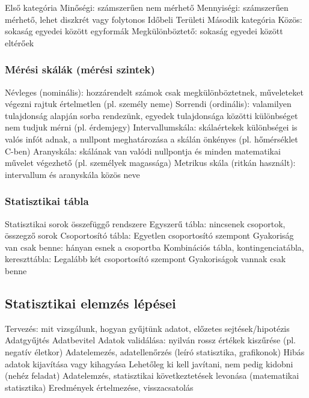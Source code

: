 \documentclass[12pt,a4paper]{article}
\begin{document}
\begin{outline}
	\1 Első kategória
		\2 Minőségi: számszerűen nem mérhető
		\2 Mennyiségi: számszerűen mérhető, lehet diszkrét vagy folytonos
		\2 Időbeli
		\2 Területi
	\1 Második kategória
		\2 Közös: sokaság egyedei között egyformák
		\2 Megkülönböztető: sokaság egyedei között eltérőek
\end{outline}

\pagebreak

\subsubsection{Mérési skálák (mérési szintek)}

\begin{outline}
	\1 Névleges (nominális): hozzárendelt számok csak megkülönböztetnek, műveleteket végezni rajtuk értelmetlen (pl. személy neme)
	\1 Sorrendi (ordinális): valamilyen tulajdonság alapján sorba rendezünk, egyedek tulajdonsága közötti különbséget nem tudjuk mérni (pl. érdemjegy)
	\1 Intervallumskála: skálaértekek különbségei is valós infót adnak, a nullpont meghatározása a skálán önkényes (pl. hőmérséklet C-ben)
	\1 Aranyskála: skálának van valódi nullpontja és minden matematikai művelet végezhető (pl. személyek magassága)
	\1 Metrikus skála (ritkán használt): intervallum és aranyskála közös neve
\end{outline}

\subsubsection{Statisztikai tábla}

\begin{outline}
	\1 Statisztikai sorok összefüggő rendszere
	\1 Egyszerű tábla: nincsenek csoportok, összegző sorok
	\1 Csoportosító tábla:
		\2 Egyetlen csoportosító szempont
		\2 Gyakoriság van csak benne: hányan esnek a csoportba
	\1 Kombinációs tábla, kontingenciatábla, kereszttábla:
		\2 Legalább két csoportosító szempont
		\2 Gyakoriságok vannak csak benne
\end{outline}

\pagebreak

\subsection{Statisztikai elemzés lépései}

\begin{outline}
	\1 Tervezés: mit vizsgálunk, hogyan gyűjtünk adatot, előzetes sejtések/hipotézis
	\1 Adatgyűjtés
	\1 Adatbevitel
	\1 Adatok validálása: nyilván rossz értékek kiszűrése (pl. negatív életkor)
	\1 Adatelemezés, adatellenőrzés (leíró statisztika, grafikonok)
	\1 Hibás adatok kijavítása vagy kihagyása
		\2 Lehetőleg ki kell javítani, nem pedig kidobni (nehéz feladat)
	\1 Adatelemzés, statisztikai következtetések levonása (matematikai statisztika)
	\1 Eredmények értelmezése, visszacsatolás
\end{outline}
\end{document}
